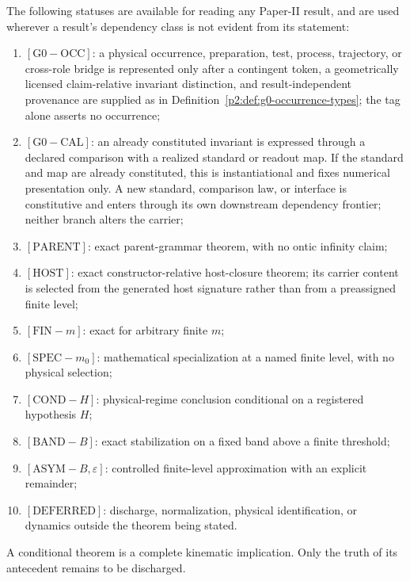 \documentclass[12pt,a4paper]{article}
\begin{document}
\begin{definition}
\label{p2:def:paper-ii-status-convention}
The following statuses are available for reading any Paper-II result, and are
used wherever a result's dependency class is not evident from its statement:
\begin{enumerate}[label=(\roman*),leftmargin=2em]
\item \([\mathrm{G0}{-}\mathrm{OCC}]\): a physical occurrence, preparation,
test, process, trajectory, or cross-role bridge is represented only after a
contingent token, a geometrically licensed claim-relative invariant
distinction, and result-independent provenance are supplied as in
Definition~\ref{p2:def:g0-occurrence-types}; the tag alone asserts no
occurrence;
\item \([\mathrm{G0}{-}\mathrm{CAL}]\): an already constituted invariant is
expressed through a declared comparison with a realized standard or readout
map.  If the standard and map are already constituted, this is
instantiational and fixes numerical presentation only.  A new standard,
comparison law, or interface is constitutive and enters through its own
downstream dependency frontier; neither branch alters the carrier;
\item \([\mathrm{PARENT}]\): exact parent-grammar theorem, with no ontic
infinity claim;
\item \([\mathrm{HOST}]\): exact constructor-relative host-closure theorem;
its carrier content is selected from the generated host signature rather than
from a preassigned finite level;
\item \([\mathrm{FIN}{-}m]\): exact for arbitrary finite \(m\);
\item \([\mathrm{SPEC}{-}m_0]\): mathematical specialization at a named
finite level, with no physical selection;
\item \([\mathrm{COND}{-}H]\): physical-regime conclusion conditional on a
registered hypothesis \(H\);
\item \([\mathrm{BAND}{-}B]\): exact stabilization on a fixed band above a
finite threshold;
\item \([\mathrm{ASYM}{-}B,\varepsilon]\): controlled finite-level
approximation with an explicit remainder;
\item \([\mathrm{DEFERRED}]\): discharge, normalization, physical
identification, or dynamics outside the theorem being stated.
\end{enumerate}
A conditional theorem is a complete kinematic implication.  Only the truth of
its antecedent remains to be discharged.
\end{definition}
\end{document}
